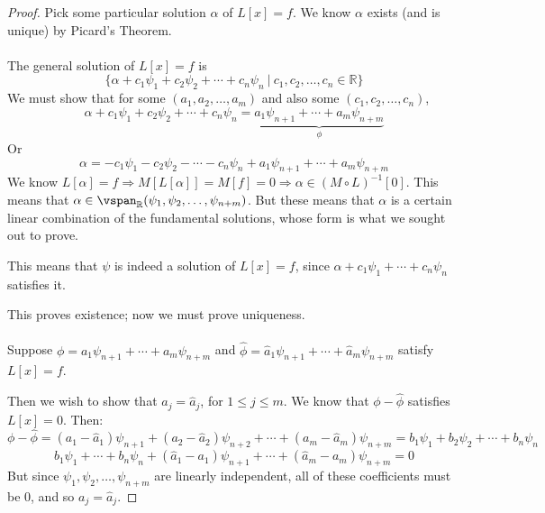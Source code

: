 \documentclass[12pt]{article}
\begin{document}
\begin{proof}
Pick some particular solution $\alpha$ of $L[x] = f$. We know $\alpha$ exists (and is unique) by Picard's Theorem. \\ \\
The general solution of $L[x] = f$ is \[ \{ \alpha + c_1\psi_1 + c_2\psi_2 + \cdots + c_n\psi_n \ | \ c_1,c_2,\dots,c_n \in \mathbb{R} \} \]
We must show that for some $(a_1,a_2,\dots,a_m)$ and also some $(c_1,c_2,\dots,c_n)$, \[ \alpha + c_1\psi_1 + c_2\psi_2 + \cdots + c_n\psi_n = \underbrace{a_1\psi_{n+1} + \cdots + a_m\psi_{n+m}}_{\phi} \]
Or \[ \alpha = -c_1\psi_1 - c_2\psi_2 - \cdots - c_n\psi_n + a_1\psi_{n+1} + \cdots + a_m\psi_{n+m} \]
We know $L[\alpha] = f \Rightarrow M[L[\alpha]] = M[f] = 0 \Rightarrow \alpha \in (M \circ L)^{-1}[0]$. This means that $\alpha \in \vspan_{\mathbb{R}}(\psi_1,\psi_2,\dots,\psi_{n+m})$. But these means that $\alpha$ is a certain linear combination of the fundamental solutions, whose form is what we sought out to prove.

This means that $\psi$ is indeed a solution of $L[x] = f$, since $\alpha + c_1\psi_1 + \cdots + c_n\psi_n$ satisfies it.

This proves existence; now we must prove uniqueness. \\ \\

Suppose $\phi = a_1\psi_{n+1} + \cdots + a_m\psi_{n+m}$ and $\hat{\phi} = \hat{a}_1\psi_{n+1} + \cdots + \hat{a}_m\psi_{n+m}$ satisfy $L[x] = f$.

Then we wish to show that $a_j = \hat{a}_j$, for $1 \le j \le m$. We know that $\phi - \hat{\phi}$ satisfies $L[x] = 0$. Then:
\[ \phi - \hat{\phi} = (a_1 - \hat{a}_1)\psi_{n+1} + (a_2 - \hat{a}_2)\psi_{n+2} + \cdots + (a_m - \hat{a}_m)\psi_{n+m} = b_1\psi_1 + b_2\psi_2 + \cdots + b_n\psi_n \]
\[ b_1\psi_1 + \cdots + b_n\psi_n + (\hat{a}_1 - a_1)\psi_{n+1} + \cdots + (\hat{a}_m - a_m)\psi_{n+m} = 0 \]
But since $\psi_1,\psi_2,\dots,\psi_{n+m}$ are linearly independent, all of these coefficients must be 0, and so $a_j = \hat{a}_j$.
\end{proof}
\end{document}
